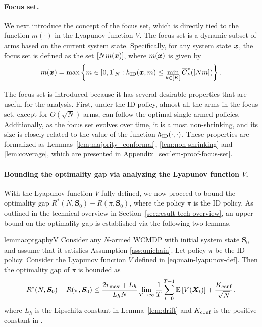\documentclass[11pt,letterpaper]{article}
\begin{document}
\paragraph{Focus set.}
We next introduce the concept of the focus set, which is directly tied to the function $m(\cdot)$ in the Lyapunov function $V$.
The focus set is a dynamic subset of arms based on the current system state.
Specifically, for any system state $\bm{x}$, the focus set is defined as the set $[Nm(\bm{x})]$, where $m(\bm{x})$ is given by
\begin{align}
    m(\bm{x})= \max \left\{  m\in[0,1]_N: h_{\textnormal{ID}}(\bm{x},m)\leq \min_{k\in[K]}\overline{C}^*_k([Nm]) \right\}.\label{eq:focus set def}
\end{align}

The focus set is introduced because it has several desirable properties that are useful for the analysis.
First, under the ID policy, almost all the arms in the focus set, except for $O(\sqrt{N})$ arms, can follow the optimal single-armed policies.
Additionally, as the focus set evolves over time, it is almost non-shrinking, and its size is closely related to the value of the function $h_{\textnormal{ID}}(\cdot,\cdot)$.
These properties are formalized as Lemmas~\ref{lem:majority_conformal}, \ref{lem:non-shrinking} and \ref{lem:coverage}, which are presented in Appendix~\ref{sec:lem-proof-focus-set}.


\paragraph{Bounding the optimality gap via analyzing the Lyapunov function $V$.}

With the Lyapunov function $V$ fully defined, we now proceed to bound the optimality gap $R^*(N,\bm{S}_0)-R(\pi,\bm{S}_0)$, where the policy $\pi$ is the ID policy.
As outlined in the technical overview in Section~\ref{sec:result-tech-overview}, an upper bound on the optimality gap is established via the following two lemmas.

\begin{restatable}{lemma}{optgapbyV}\label{lem:optimality gap}
Consider any $N$-armed WCMDP with initial system state $\bm{S}_0$ and assume that it satisfies Assumption \ref{ass:unichain}. Let policy $\pi$ be the ID policy.
Consider the Lyapunov function $V$ defined in \eqref{eq:main-lyapunov-def}.
Then the optimality gap of $\pi$ is bounded as
\begin{align*}
    R^*(N,\bm{S}_0)-R(\pi,\bm{S}_0)\leq \frac{2r_{\max}+L_h}{L_h N}\lim_{T\to\infty}\frac{1}{T}\sum_{t=0}^{T-1}\mathbb{E}\left[V({\bm{X}}_{t})\right] + \frac{K_{\text{conf}}}{\sqrt{N}}\,,
\end{align*}
where $L_h$ is the Lipschitz constant in Lemma~\ref{lem:drift} and $K_{\text{conf}}$ is the positive constant in . 
\end{restatable}
\end{document}
